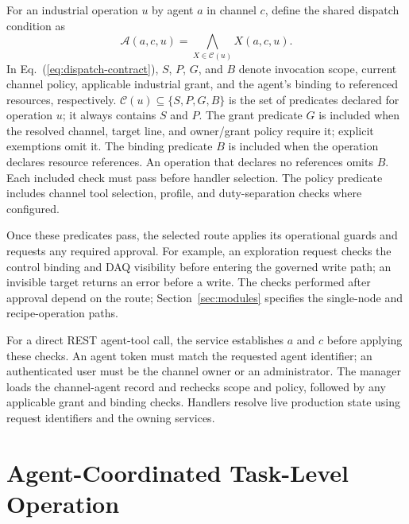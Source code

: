 \documentclass[journal]{IEEEtran}
\begin{document}
For an industrial operation $u$ by agent $a$ in channel $c$, define the
shared dispatch condition as
\begin{equation}
\mathcal{A}(a,c,u)=\bigwedge_{X\in\mathcal{C}(u)}X(a,c,u).
\label{eq:dispatch-contract}
\end{equation}
In Eq.~(\ref{eq:dispatch-contract}), $S$, $P$, $G$, and $B$ denote invocation scope, current channel policy,
applicable industrial grant, and the agent's binding to referenced resources,
respectively. $\mathcal{C}(u)\subseteq\{S,P,G,B\}$ is the set of predicates
declared for operation $u$; it always contains $S$ and $P$. The grant predicate
$G$ is included when the resolved channel, target line, and owner/grant policy
require it; explicit exemptions omit it. The binding predicate $B$ is included
when the operation declares resource references. An operation that declares
no references omits $B$. Each included check must pass before handler
selection. The policy predicate includes channel tool selection, profile, and duty-separation checks where
configured.

Once these predicates pass, the selected route applies its operational
guards and requests any required approval. For example, an exploration request checks
the control binding and DAQ visibility before entering the governed write
path; an invisible target returns an error before a write. The checks performed
after approval depend on the route; Section~\ref{sec:modules} specifies the
single-node and recipe-operation paths.

For a direct REST agent-tool call, the service establishes $a$ and $c$ before applying
these checks. An agent token must match the requested agent identifier; an
authenticated user must be the channel owner or an administrator. The manager
loads the channel-agent record and rechecks scope and policy, followed by any
applicable grant and binding checks. Handlers resolve live production state
using request identifiers and the owning services.


 \section{Agent-Coordinated Task-Level Operation}
\label{sec:closed-loop-operation}
\end{document}
